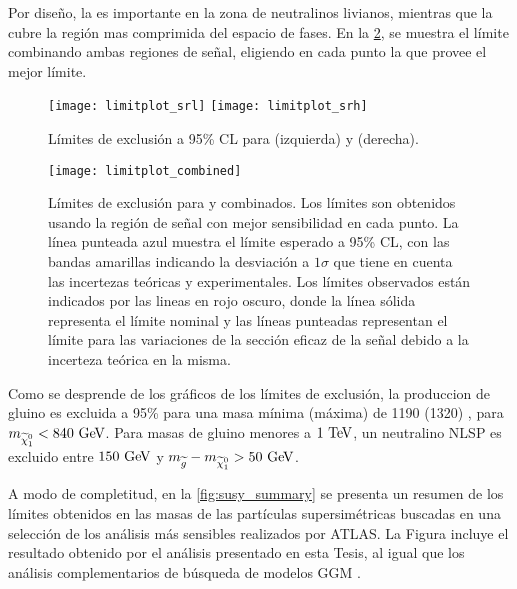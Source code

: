 Por diseño, la {\SRL} es importante en la zona de neutralinos livianos, mientras que
la {\SRH} cubre la región mas comprimida del espacio de fases. En la
\cref{fig:limit_combined}, se muestra el límite combinando ambas
regiones de señal, eligiendo en cada punto la que provee el mejor límite.


\begin{figure}[!htb]
  \centering

  \texttt{[image: limitplot\_srl]}
  \texttt{[image: limitplot\_srh]}

  \caption{Límites de exclusión a 95\% CL para {\SRL}  (izquierda) y {\SRH} (derecha).}
  \label{fig:limit_srs}
\end{figure}


\begin{figure}[!htb]
  \centering

  \texttt{[image: limitplot\_combined]}

  \caption{Límites de exclusión para {\SRL} y {\SRH} combinados.
    Los límites son obtenidos usando la región de señal con mejor sensibilidad
    en cada punto.
    La línea punteada azul muestra el límite esperado a 95\% CL, con las bandas amarillas indicando la desviación a
    $1\sigma$ que tiene en cuenta las incertezas teóricas y experimentales. Los
    límites observados están indicados por las lineas en rojo oscuro, donde la línea
    sólida representa el límite nominal y las líneas punteadas representan el límite
    para las variaciones de la sección eficaz de la señal debido a la incerteza
    teórica en la misma.}
   \label{fig:limit_combined}

\end{figure}


Como se desprende de los gráficos de los límites de exclusión, la produccion de
gluino es excluida a 95\% {\cl} para una masa mínima (máxima) de 1190 (1320)
\gev, para $m_{\ninoone}<{840}\gev$. Para masas de gluino menores a $1\tev$, un
neutralino NLSP es excluido entre $150\gev$ y $m_{\gluino}-m_{\ninoone}>50\gev$.

A modo de completitud, en la \cref{fig:susy_summary} se presenta un resumen de los límites obtenidos en
las masas de las partículas supersimétricas buscadas en una selección de los
análisis más sensibles realizados por ATLAS. La Figura incluye el resultado obtenido
por el análisis presentado en esta Tesis, al igual que los análisis
complementarios de búsqueda de modelos GGM .



